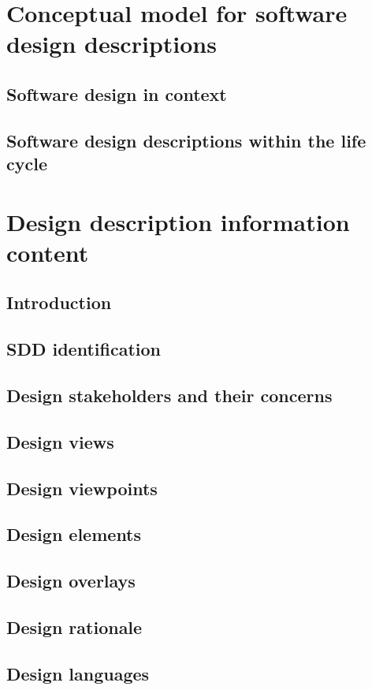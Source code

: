 \documentclass[compsoc,draftclsnofoot,onecolumn,10pt]{IEEEtran}
\begin{document}
\section{Conceptual model for software design descriptions} 
\subsection{Software design in context}
\subsection{Software design descriptions within the life cycle}

\section{Design description information content} 
\subsection{Introduction}
\subsection{SDD identification}
\subsection{Design stakeholders and their concerns} 
\subsection{Design views}
\subsection{Design viewpoints} 
\subsection{Design elements} 
\subsection{Design overlays}
\subsection{Design rationale}
\subsection{Design languages}
\end{document}
